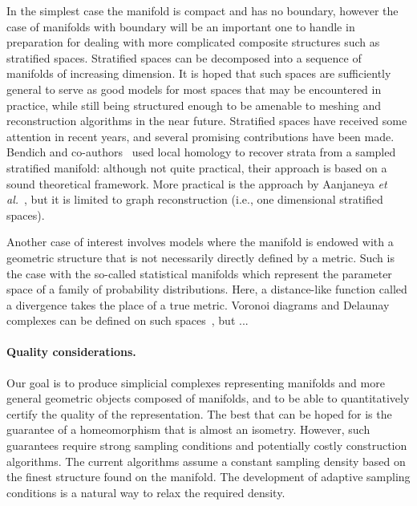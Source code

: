 In the simplest case the manifold is compact and has no boundary,
however the case of manifolds with boundary will be an important one
to handle in preparation for dealing with more complicated composite
structures such as stratified spaces. Stratified spaces can be
decomposed into a sequence of manifolds of increasing dimension.  It
is hoped that such spaces are sufficiently general to serve as good
models for most spaces that may be encountered in practice, while
still being structured enough to be amenable to meshing and
reconstruction algorithms in the near future.  Stratified spaces have
received some attention in recent years, and several promising
contributions have been made.  Bendich and
co-authors~\cite{bendich-PhD,bendich-strat1,bendich-strat2} used local
homology to recover strata from a sampled stratified manifold:
although not quite practical, their approach is based on a sound
theoretical framework. More practical is the approach by Aanjaneya
{\em et al.}~\cite{metric-graphs-reconstruction}, but it is limited to
graph reconstruction (i.e., one dimensional stratified spaces). 

Another case of interest involves models where the manifold is endowed
with a geometric structure that is not necessarily directly defined by
a metric. Such is the case with the so-called statistical manifolds
which represent the parameter space of a family of probability
distributions. Here, a distance-like function called a divergence
takes the place of a true metric.  Voronoi diagrams and Delaunay
complexes can be defined on such
spaces~\cite{onishi1998,boissonnat2010bregvor}, but ... 


\paragraph{Quality considerations.}
Our goal is to produce simplicial complexes representing manifolds and
more general geometric objects composed of manifolds, and to be able
to quantitatively certify the quality of the representation. The best
that can be hoped for is the guarantee of a homeomorphism that is
almost an isometry. However, such guarantees require strong sampling
conditions and potentially costly construction algorithms. The current
algorithms assume a constant sampling density based on the finest
structure found on the manifold. The development of adaptive sampling
conditions is a natural way to relax the required density. 

